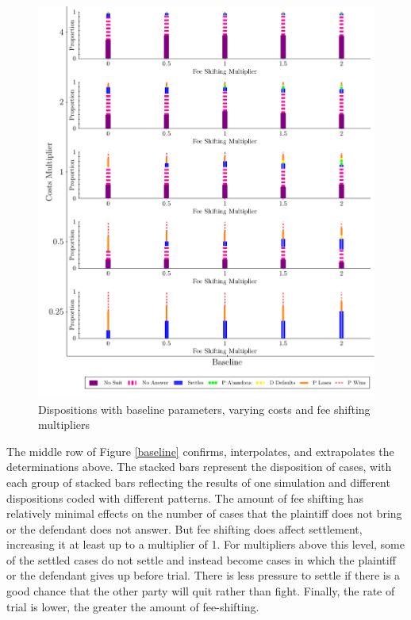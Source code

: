 \documentclass{article}
\begin{document}
\begin{figure}[h!]
\centering
\includegraphics[scale=0.50, trim={0in 0in 0in 0in}, clip]{../Figures/Disposition Baseline.pdf}
\caption{Dispositions with baseline parameters, varying costs and fee shifting multipliers}
\label{fig:disposition_baseline}
\end{figure}

The middle row of Figure \ref{baseline} confirms, interpolates, and extrapolates the determinations above. The stacked bars represent the disposition of cases, with each group of stacked bars reflecting the results of one simulation and different dispositions coded with different patterns. The amount of fee shifting has relatively minimal effects on the number of cases that the plaintiff does not bring or the defendant does not answer. But fee shifting does affect settlement, increasing it at least up to a multiplier of 1. For multipliers above this level, some of the settled cases do not settle and instead become cases in which the plaintiff or the defendant gives up before trial. There is less pressure to settle if there is a good chance that the other party will quit rather than fight. Finally, the rate of trial is lower, the greater the amount of fee-shifting. 
\end{document}
